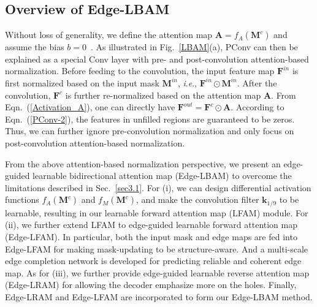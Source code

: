 \documentclass[10pt,journal,compsoc]{IEEEtran}
\newcommand{\ie}{\textit{i}.\textit{e}.}
\begin{document}
\subsection{Overview of Edge-LBAM}\label{sec3.2}
%
Without loss of generality, we define the attention map $\mathbf{A} = f_A(\mathbf{M}^c)$ and assume the bias $b = 0$~\cite{isola2017cvpr,Yan_2018_Shift}.
%
As illustrated in Fig.~\ref{LBAM}(a),
PConv can then be explained as a special Conv layer with pre- and post-convolution attention-based normalization.
%
Before feeding to the convolution, the input feature map $\mathbf{F}^{in}$ is first normalized based on the input mask $\mathbf{M}^{in}$, \ie, $\mathbf{F}^{in} \odot \mathbf{M}^{in}$.
%
After the convolution, $\mathbf{F}^c$ is further re-normalized based on the attention map $\mathbf{A}$.
%
From Eqn.~(\ref{Activation_A}), one can directly have $\mathbf{F}^{out} = \mathbf{F}^{c} \odot \mathbf{A}$.
%
According to Eqn.~(\ref{PConv-2}), the features in unfilled regions are guaranteed to be zeros.
%
Thus, we can further ignore pre-convolution normalization and only focus on post-convolution attention-based normalization.


From the above attention-based normalization perspective, we present an edge-guided learnable bidirectional attention map (Edge-LBAM) to overcome the limitations described in Sec.~\ref{sec3.1}.
%
For (i), we can design differential activation functions $f_A(\mathbf{M}^c)$ and $f_M(\mathbf{M}^c)$, and make the convolution filter $\mathbf{k}_{{1}/{9}}$ to be learnable, resulting in our learnable forward attention map (LFAM) module.
%
For (ii), we further extend LFAM to edge-guided learnable forward attention map (Edge-LFAM).
%
In particular, both the input mask and edge maps are fed into Edge-LFAM for making mask-updating to be structure-aware.
%
And a multi-scale edge completion network is developed for predicting reliable and coherent edge map.
%
As for (iii), we further provide edge-guided learnable reverse attention map (Edge-LRAM) for allowing the decoder emphasize more on the holes.
%
Finally, Edge-LRAM and Edge-LFAM are incorporated to form our Edge-LBAM method.



%
%
%
%
%
\end{document}
